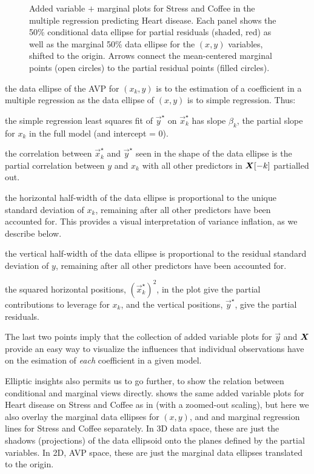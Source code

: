 \begin{figure}[htb]
\begin{minipage}[b]{.49\linewidth}
 \end{minipage}
  \caption{Added variable $+$ marginal plots for Stress and Coffee in the multiple regression predicting Heart disease.
Each panel shows the 50\% conditional data ellipse for partial residuals (shaded, red) as well as the marginal 50\% 
data ellipse for the $(x, y)$ variables, shifted to the origin.
Arrows connect the mean-centered marginal points (open circles) to the partial residual points (filled circles).}
  \label{fig:coffee-avplot-B}
\end{figure}

\begin{itemize*}
 \item the data ellipse of the AVP for $(x_k, y)$ is to the estimation of a coefficient in a multiple regression as
 the data ellipse of $(x, y)$ is to simple regression. Thus:
 \item the simple regression least squares fit of $\vec{y}^\star$ on $\vec{x}_k^\star$ has slope $\beta_k$,
 the partial slope for $x_k$ in the full model (and intercept = 0). 
 \item the correlation between $\vec{x}_k^\star$ and $\vec{y}^\star$ seen in the shape of the data ellipse
 is the partial correlation between $y$ and $x_k$ with all other predictors in $\bm{X}[-k]$ partialled out.
 \item the horizontal half-width of the data ellipse is proportional to the unique standard deviation of
 $x_k$, remaining after all other predictors have been accounted for.  This provides a visual interpretation
 of variance inflation, as we describe below.
 \item the vertical half-width of the data ellipse is proportional to the residual standard deviation of
 $y$, remaining after all other predictors have been accounted for.
 \item the squared horizontal positions, $(\vec{x}_k^\star)^2$, in the plot give the partial contributions
 to leverage for $x_k$, and the vertical positions, $\vec{y}^\star$, give the partial residuals.
 \item The last two points imply that the collection of added variable plots for $\vec{y}$ and
 $\bm{X}$ provide an easy way to visualize the influences that individual observations have on
 the esimation of \emph{each} coefficient in a given model.
\end{itemize*}


Elliptic insights also permits us to go further, to show the relation between conditional and marginal views
directly.
 shows the same added variable plots for Heart disease on Stress and Coffee
as in  (with a zoomed-out scaling), but here we also overlay the 
marginal data ellipses for $(x, y)$,
and and marginal regression lines for Stress and Coffee separately.  In 3D data space,
these are just the shadows (projections) of the data ellipsoid onto the planes defined by the
partial variables.  In 2D, AVP space, these are just the marginal data ellipses translated to
the origin.

